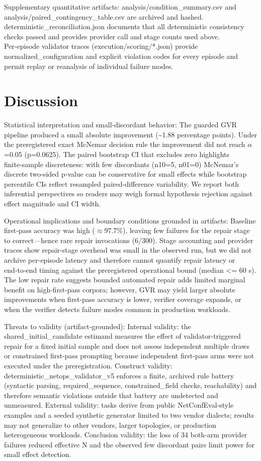 \documentclass[conference]{IEEEtran}
\begin{document}
Supplementary quantitative artifacts: analysis/condition\_summary.csv and analysis/paired\_contingency\_table.csv are archived and hashed. deterministic\_reconciliation.json documents that all deterministic consistency checks passed and provides provider call and stage counts used above. Per‑episode validator traces (execution/scoring/*.json) provide normalized\_configuration and explicit violation codes for every episode and permit replay or reanalysis of individual failure modes.

\section{Discussion}
Statistical interpretation and small‑discordant behavior: The guarded GVR pipeline produced a small absolute improvement (\textasciitilde{}1.88 percentage points). Under the preregistered exact McNemar decision rule the improvement did not reach \ensuremath{\alpha}=0.05 (p=0.0625). The paired bootstrap CI that excludes zero highlights finite‑sample discreteness: with few discordants (n10=5, n01=0) McNemar's discrete two‑sided p‑value can be conservative for small effects while bootstrap percentile CIs reflect resampled paired‑difference variability. We report both inferential perspectives so readers may weigh formal hypothesis rejection against effect magnitude and CI width.

Operational implications and boundary conditions grounded in artifacts: Baseline first‑pass accuracy was high (\ensuremath{\approx}97.7\%), leaving few failures for the repair stage to correct---hence rare repair invocations (6/300). Stage accounting and provider traces show repair-stage overhead was small in the observed run, but we did not archive per‑episode latency and therefore cannot quantify repair latency or end‑to‑end timing against the preregistered operational bound (median <= 60 s). The low repair rate suggests bounded automated repair adds limited marginal benefit on high‑first‑pass corpora; however, GVR may yield larger absolute improvements when first‑pass accuracy is lower, verifier coverage expands, or when the verifier detects failure modes common in production workloads.

Threats to validity (artifact‑grounded): Internal validity: the shared\_initial\_candidate estimand measures the effect of validator‑triggered repair for a fixed initial sample and does not assess independent multiple draws or constrained first‑pass prompting because independent first‑pass arms were not executed under the preregistration. Construct validity: deterministic\_netops\_validator\_v5 enforces a finite, archived rule battery (syntactic parsing, required\_sequence, constrained\_field checks, reachability) and therefore semantic violations outside that battery are undetected and unmeasured. External validity: tasks derive from public NetConfEval‑style examples and a seeded synthetic generator limited to two vendor dialects; results may not generalize to other vendors, larger topologies, or production heterogeneous workloads. Conclusion validity: the loss of 34 both‑arm provider failures reduced effective N and the observed few discordant pairs limit power for small effect detection.
\end{document}
